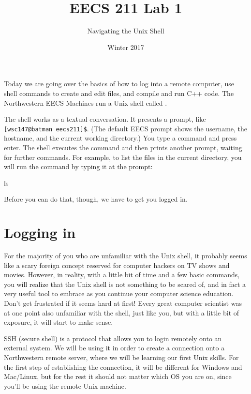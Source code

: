 \documentclass{tufte-handout}
\title{EECS 211 Lab 1}
\author{Navigating the Unix Shell}
\date{Winter 2017}
\begin{document}
\maketitle

Today we are going over the basics of how to log into a remote computer,
use shell commands to create and edit files, and compile and run C++
code. The Northwestern EECS Machines run a Unix shell called
.

The shell works as a textual conversation. It presents a prompt, like
\verb![wsc147@batman eecs211]$!. (The default EECS prompt shows the
username, the hostname, and the current working directory.) You type a
command and press enter. The shell executes the command and then prints
another prompt, waiting for further commands. For example, to list the
files in the current directory, you will run the  command
by typing it at the prompt:

\begin{CmdLine}
  \prompt ls
\end{CmdLine}


\noindent
Before you can do that, though, we have to get you logged in.

\section{Logging in}

For the majority of you who are unfamiliar with the Unix shell, it
probably seems like a scary foreign concept reserved for computer
hackers on TV shows and movies.  However, in reality, with a little bit
of time and a few basic commands, you will realize that the Unix shell
is not something to be scared of, and in fact a very useful tool to
embrace as you continue your computer science education. Don't get
frustrated if it seems hard at first! Every great computer scientist was
at one point also unfamiliar with the shell, just like you, but with a
little bit of exposure, it will start to make sense.

SSH (secure shell) is a protocol that allows you to login remotely onto
an external system. We will be using it in order to create a connection
onto a Northwestern remote server, where we will be learning our first
Unix skills. For the first step of establishing the connection, it will
be different for Windows and Mac/Linux, but for the rest it should not
matter which OS you are on, since you'll be using the remote Unix
machine.
\end{document}
